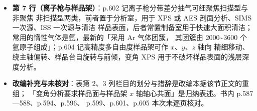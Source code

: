 \begin{itemize}
中和枪」，作用是使作为内标的相应峰移到所定位置，并消除荷电不均匀引起的多重裂分谱峰。
\item \textbf{第 7 行（离子枪与样品架）}：p.602 记离子枪分带差分抽气可细聚焦扫描型与非聚焦
非扫描型两类，前者置于分析室，用于 XPS 或 AES 剖面分析、SIMS 一次源、ISS 一次源与清洁
样品表面，后者常置制备室用于快速大面积清洁；常用的惰性气体是氩，最新的「采用 Ar 气体团簇，
其团簇由 2000\~{}3600 个氩原子组成」；p.604 记高精度多自由度样品架可作 $x$、$y$、$z$ 轴向
精细移动、绕主轴偏转、样品台自旋转与前倾，变角 XPS 用于不破坏样品表面的浅层深度分析。
\item \textbf{改编补充与未核对}：表第 2、3 列栏目的划分与措辞是改编本据该节正文的重组；
「变角分析要求样品面与样品架 $x$ 轴轴心共面」是归纳表述。书内 p.587—588、p.594、p.596、
p.599、p.601、p.605 本次未逐页核对。
\end{itemize}

